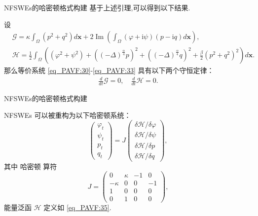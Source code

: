 \documentclass[aspectratio=169]{beamer}
\numberwithin{theorem}{section} %
\numberwithin{equation}{section}%
\numberwithin{figure}{section}%
\numberwithin{table}{section}%
\begin{document}
\begin{frame}{NFSWEs的哈密顿格式构建}
	\noindent 基于上述引理,可以得到以下结果.

	\begin{theorem}	\label{thm_PAVF:2_1}
	设
	\begin{align}
	&\mathcal{G}=\kappa\int_{\Omega}(p^2+q^2) d \boldsymbol{x}+2\operatorname{Im}(\int_{\Omega}(\varphi+\mathrm{i}\psi)(p-\mathrm{i}q)d \boldsymbol{x}),\label{eq_PAVF:34} \\
	&\mathcal{H}=\frac{1}{2}\int_{\Omega}\left((\varphi^2+\psi^2)+\left((-\Delta)^{\frac{\alpha}{4}} p\right)^{2}+\left((-\Delta)^{\frac{\alpha}{4}} q\right)^{2}+\frac{\beta}{2}(p^2+q^2)^{2}\right) d \boldsymbol{x}.\label{eq_PAVF:35}
	\end{align}
	那么等价系统 \eqref{eq_PAVF:30}-\eqref{eq_PAVF:33} 具有以下两个守恒定律：
	\begin{align}
	\frac{d}{d t} \mathcal{G}=0, \quad \frac{d}{d t} \mathcal{H}=0.
	\end{align}
	\end{theorem}
\end{frame}


\begin{frame}{NFSWEs的哈密顿格式构建}

	\begin{theorem}\label{thm_PAVF:2}
		NFSWEs 可以被重构为以下哈密顿系统：
		{\color{purple}\begin{equation}\label{eq_PAVF:37}
		\left(\begin{array}{l}
			\varphi_{t} \\
			\psi_{t} \\
			p_{t} \\
			q_{t}
			\end{array}\right)=J\left(\begin{array}{l}
			\delta \mathcal{H} / \delta \varphi \\
			\delta \mathcal{H} / \delta \psi \\
			\delta \mathcal{H} / \delta p \\
			\delta \mathcal{H} / \delta q
			\end{array}\right),
	\end{equation}}
	其中 哈密顿 算符
	\begin{equation}\label{eq_PAVF:37b}
	J=\left(\begin{array}{cccc}
			0 & \kappa & -1 & 0 \\
			-\kappa & 0 & 0 & -1 \\
			1 & 0 & 0 & 0 \\
			0 & 1 & 0 & 0
			\end{array}\right),
	\end{equation}
	能量泛函 $\mathcal{H}$ 定义如 \eqref{eq_PAVF:35}.
	\end{theorem}
\end{frame}
\end{document}
